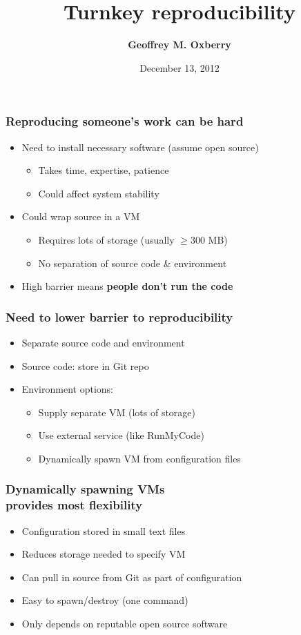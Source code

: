 \documentclass [14pt]{beamer}
\title[Turnkey reproducibility]
{Turnkey reproducibility}
\author[G. Oxberry]
{\textbf{Geoffrey M. Oxberry}}
\institute[LLNL]
{
 Lawrence Livermore National Laboratory \\
Computational Engineering Division \\
Energy Conversion and Storage
}
\date[ICERM 2012]
{December 13, 2012}
\begin{document}
\begin{frame}
\titlepage
\end{frame}

\begin{frame}
\frametitle{Reproducing someone's work can be hard}
\begin{itemize}
\item Need to install necessary software (assume open source)
\begin{itemize}
\item Takes time, expertise, patience
\item Could affect system stability
\end{itemize}
\item Could wrap source in a VM
\begin{itemize}
\item Requires lots of storage (usually $\geq 300$ MB)
\item No separation of source code \& environment
\end{itemize}
\item High barrier means \textbf{people don't run the code}
\end{itemize}
\end{frame}

\begin{frame}
\frametitle{Need to lower barrier to reproducibility}
\begin{itemize}
\item Separate source code and environment
\item Source code: store in Git repo
\item Environment options:
\begin{itemize}
\item Supply separate VM (lots of storage)
\item Use external service (like RunMyCode)
\item Dynamically spawn VM from configuration files
\end{itemize}
\end{itemize}
\end{frame}

\begin{frame}
\frametitle{Dynamically spawning VMs\\ provides most flexibility}
\begin{itemize}
\item Configuration stored in small text files
\item Reduces storage needed to specify VM
\item Can pull in source from Git as part of configuration
\item Easy to spawn/destroy (one command)
\item Only depends on reputable open source software
\end{itemize}
\end{frame}
\end{document}
